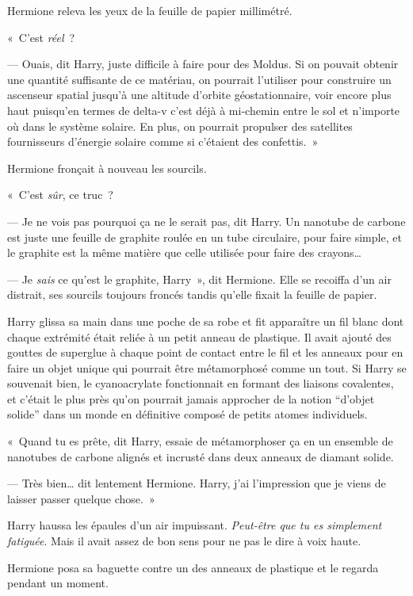 Hermione releva les yeux de la feuille de papier millimétré.

«~C'est \emph{réel}~?

--- Ouais, dit Harry, juste difficile à faire pour des Moldus. Si on pouvait obtenir une quantité suffisante de ce matériau, on pourrait l'utiliser pour construire un ascenseur spatial jusqu'à une altitude d'orbite géostationnaire, voir encore plus haut puisqu'en termes de delta-v c'est déjà à mi-chemin entre le sol et n'importe où dans le système solaire. En plus, on pourrait propulser des satellites fournisseurs d'énergie solaire comme si c'étaient des confettis.~»

Hermione fronçait à nouveau les sourcils.

«~C'est \emph{sûr}, ce truc~?

--- Je ne vois pas pourquoi ça ne le serait pas, dit Harry. Un nanotube de carbone est juste une feuille de graphite roulée en un tube circulaire, pour faire simple, et le graphite est la même matière que celle utilisée pour faire des crayons…

--- Je \emph{sais} ce qu'est le graphite, Harry~», dit Hermione. Elle se recoiffa d'un air distrait, ses sourcils toujours froncés tandis qu'elle fixait la feuille de papier.

Harry glissa sa main dans une poche de sa robe et fit apparaître un fil blanc dont chaque extrémité était reliée à un petit anneau de plastique. Il avait ajouté des gouttes de superglue à chaque point de contact entre le fil et les anneaux pour en faire un objet unique qui pourrait être métamorphosé comme un tout. Si Harry se souvenait bien, le cyanoacrylate fonctionnait en formant des liaisons covalentes, et c'était le plus près qu'on pourrait jamais approcher de la notion “d'objet solide” dans un monde en définitive composé de petits atomes individuels.

«~Quand tu es prête, dit Harry, essaie de métamorphoser ça en un ensemble de nanotubes de carbone alignés et incrusté dans deux anneaux de diamant solide.

--- Très bien… dit lentement Hermione. Harry, j'ai l'impression que je viens de laisser passer quelque chose.~»

Harry haussa les épaules d'un air impuissant. \emph{Peut-être que tu es simplement fatiguée}. Mais il avait assez de bon sens pour ne pas le dire à voix haute.

Hermione posa sa baguette contre un des anneaux de plastique et le regarda pendant un moment.

